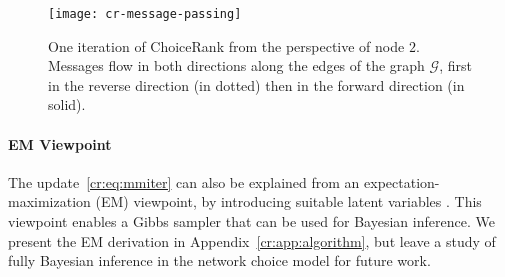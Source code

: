 \begin{figure}[t]
  \centering
  \texttt{[image: cr-message-passing]}
  \caption{One iteration of ChoiceRank from the perspective of node $2$.
  Messages flow in both directions along the edges of the graph $\mathcal{G}$, first in the reverse direction (in dotted) then in the forward direction (in solid).}
  \label{cr:fig:msgpassing}
\end{figure}

\paragraph{EM Viewpoint}
The update~\eqref{cr:eq:mmiter} can also be explained from an expectation-maximization (EM) viewpoint, by introducing suitable latent variables \citep{caron2012efficient}.
This viewpoint enables a Gibbs sampler that can be used for Bayesian inference.
We present the EM derivation in Appendix~\ref{cr:app:algorithm}, but leave a study of fully Bayesian inference in the network choice model for future work.
